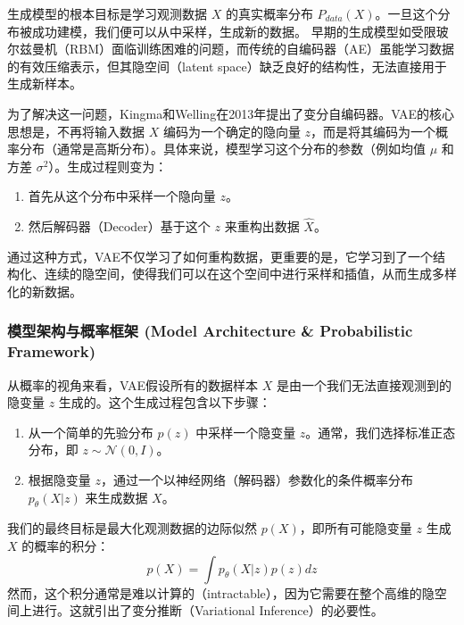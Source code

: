 \documentclass[zihao=-4, fontset=windows]{ctexart}
\begin{document}
生成模型的根本目标是学习观测数据 $X$ 的真实概率分布 $P_{data}(X)$。一旦这个分布被成功建模，我们便可以从中采样，生成新的数据。
早期的生成模型如受限玻尔兹曼机（RBM）面临训练困难的问题，而传统的自编码器（AE）虽能学习数据的有效压缩表示，但其隐空间（latent space）缺乏良好的结构性，无法直接用于生成新样本。

\begin{note}[VAE的核心思想]
	为了解决这一问题，Kingma和Welling在2013年提出了变分自编码器。VAE的核心思想是，不再将输入数据 $X$ 编码为一个确定的隐向量 $z$，而是将其编码为一个概率分布（通常是高斯分布）。具体来说，模型学习这个分布的参数（例如均值 $\mu$ 和方差 $\sigma^2$）。生成过程则变为：
	\begin{enumerate}
		\item 首先从这个分布中采样一个隐向量 $z$。
		\item 然后解码器（Decoder）基于这个 $z$ 来重构出数据 $\hat{X}$。
	\end{enumerate}
	通过这种方式，VAE不仅学习了如何重构数据，更重要的是，它学习到了一个结构化、连续的隐空间，使得我们可以在这个空间中进行采样和插值，从而生成多样化的新数据。
\end{note}

\subsubsection{模型架构与概率框架 (Model Architecture \& Probabilistic Framework)}
从概率的视角来看，VAE假设所有的数据样本 $X$ 是由一个我们无法直接观测到的隐变量 $z$ 生成的。这个生成过程包含以下步骤：
\begin{enumerate}
	\item 从一个简单的先验分布 $p(z)$ 中采样一个隐变量 $z$。通常，我们选择标准正态分布，即 $z \sim \mathcal{N}(0, I)$。
	\item 根据隐变量 $z$，通过一个以神经网络（解码器）参数化的条件概率分布 $p_\theta(X|z)$ 来生成数据 $X$。
\end{enumerate}

我们的最终目标是最大化观测数据的边际似然 $p(X)$，即所有可能隐变量 $z$ 生成 $X$ 的概率的积分：
\begin{equation}
	p(X) = \int p_\theta(X|z)p(z)dz
\end{equation}
然而，这个积分通常是难以计算的（intractable），因为它需要在整个高维的隐空间上进行。这就引出了变分推断（Variational Inference）的必要性。
\end{document}
